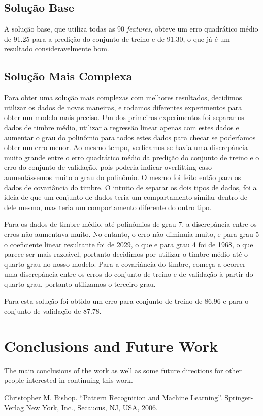 \documentclass[conference]{IEEEtran}
\begin{document}
\subsection{Solução Base}
A solução base, que utiliza todas as 90 \textit{features}, obteve um erro quadrático médio de 91.25 para a predição do conjunto de treino e de 91.30, o que já é um resultado consideravelmente bom.

\subsection{Solução Mais Complexa}
Para obter uma solução mais complexas com melhores resultados, decidimos utilizar os dados de novas maneiras, e rodamos diferentes experimentos para obter um modelo mais preciso. Um dos primeiros experimentos foi separar os dados de timbre médio, utilizar a regressão linear apenas com estes dados e aumentar o grau do polinômio para todos estes dados para checar se poderíamos obter um erro menor. Ao mesmo tempo, verficamos se havia uma discrepância muito grande entre o erro quadrático médio da predição do conjunto de treino e o erro do conjunto de validação, pois poderia indicar overfitting caso aumentássemos muito o grau do polinômio. O mesmo foi feito então para os dados de covariância do timbre. O intuito de separar os dois tipos de dados, foi a ideia de que um conjunto de dados teria um compartamento similar dentro de dele mesmo, mas teria um comportamento diferente do outro tipo.

Para os dados de timbre médio, até polinômios de grau 7, a discrepância entre os erros não aumentava muito. No entanto, o erro não diminuía muito, e para grau 5 o coeficiente linear resultante foi de 2029, o que e para grau 4 foi de 1968, o que parece ser mais razoável, portanto decidimos por utilizar o timbre médio até o quarto grau no nosso modelo. Para a covariância do timbre, começa a ocorrer uma discrepância entre os erros do conjunto de treino e de validação à partir do quarto grau, portanto utilizamos o terceiro grau.

Para esta solução foi obtido um erro para conjunto de treino de 86.96 e para o conjunto de validação de 87.78. 

\section{Conclusions and Future Work}

The main conclusions of the work as well as some future directions for other people interested in continuing this work. 

\begin{thebibliography}{00}
 Christopher M. Bishop. ``Pattern Recognition and Machine Learning''. Springer-Verlag New York, Inc., Secaucus, NJ, USA, 2006. 
\end{thebibliography}
\end{document}
